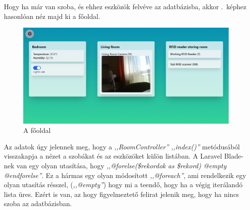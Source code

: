 \documentclass[
]{thesis-ekf}
\theoremstyle{definition}
\theoremstyle{remark}
\begin{document}
	Hogy ha már van szoba, és ehhez eszközök felvéve az adatbázisba, akkor .~képhez hasonlóan néz majd ki a főoldal.
	\begin{figure}[ht!]
		\centering
		\includegraphics[width=1\textwidth]{./src/pages_img/index}
		\caption{A főoldal}
		\label{index-page}
	\end{figure}	

	Az adatok úgy jelennek meg, hogy a \emph{,,RoomController''} \emph{,,index()''} metódusából visszakapja a nézet a szobákat és az eszközöket külön listában. A Laravel Blade-nek van egy olyan utasítása, hogy \emph{,,@forelse(\$rekordok as \$rekord) @empty @endforelse''}. Ez a hármas egy olyan módosított \emph{,,@foreach''}, ami rendelkezik egy olyan utasítás résszel, (\emph{,,@empty''}) hogy mi a teendő, hogy ha a végig iterálandó lista üres.
	Ezért is van, az hogy figyelmeztető felirat jelenik meg, hogy ha nincs szoba az adatbázisban.
	
\end{document}
